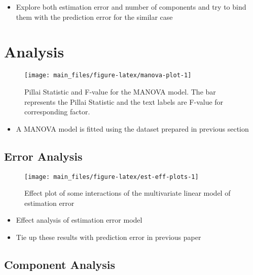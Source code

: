 \documentclass[12pt,3p,authoryear]{elsarticle}
\providecommand{\tightlist}{%
  \setlength{\itemsep}{0pt}\setlength{\parskip}{0pt}}
\begin{document}
\begin{itemize}
\tightlist
\item
  Explore both estimation error and number of components and try to bind
  them with the prediction error for the similar case
\end{itemize}

\section{Analysis}\label{analysis}





\begin{figure}
\texttt{[image: main\_files/figure-latex/manova-plot-1]} \caption{Pillai Statistic and F-value for the MANOVA model. The
bar represents the Pillai Statistic and the text labels are F-value for
corresponding factor.}\label{fig:manova-plot}
\end{figure}

\begin{itemize}
\tightlist
\item
  A MANOVA model is fitted using the dataset prepared in previous
  section
\end{itemize}

\subsection{Error Analysis}\label{error-analysis}




\begin{figure}
\texttt{[image: main\_files/figure-latex/est-eff-plots-1]} \caption{Effect plot of some interactions of the multivariate
linear model of estimation error}\label{fig:est-eff-plots}
\end{figure}

\begin{itemize}
\tightlist
\item
  Effect analysis of estimation error model
\item
  Tie up these results with prediction error in previous paper
\end{itemize}

\subsection{Component Analysis}\label{component-analysis}
\end{document}
